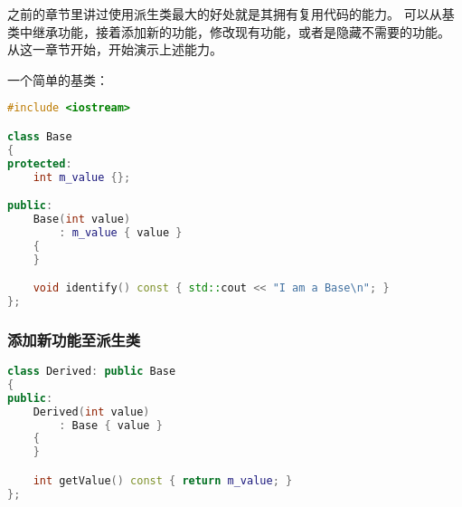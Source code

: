 \documentclass[../../LearnCpp.tex]{subfiles}
\begin{document}

之前的章节里讲过使用派生类最大的好处就是其拥有复用代码的能力。
可以从基类中继承功能，接着添加新的功能，修改现有功能，或者是隐藏不需要的功能。
从这一章节开始，开始演示上述能力。

一个简单的基类：

\begin{lstlisting}[language=C++]
#include <iostream>

class Base
{
protected:
    int m_value {};

public:
    Base(int value)
        : m_value { value }
    {
    }

    void identify() const { std::cout << "I am a Base\n"; }
};
\end{lstlisting}

\subsubsection*{添加新功能至派生类}

\begin{lstlisting}[language=C++]
class Derived: public Base
{
public:
    Derived(int value)
        : Base { value }
    {
    }

    int getValue() const { return m_value; }
};
\end{lstlisting}
\end{document}
